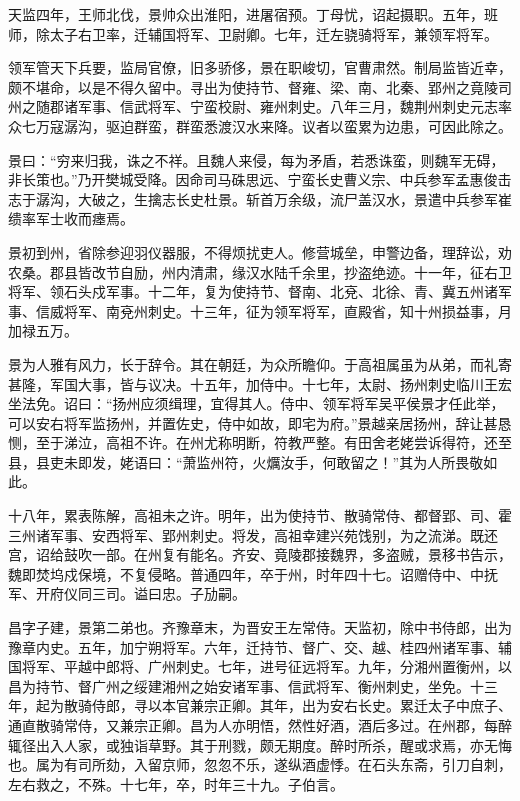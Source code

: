 \documentclass[12pt,UTF8]{ctexbook}
\begin{document}
天监四年，王师北伐，景帅众出淮阳，进屠宿预。丁母忧，诏起摄职。五年，班师，除太子右卫率，迁辅国将军、卫尉卿。七年，迁左骁骑将军，兼领军将军。

领军管天下兵要，监局官僚，旧多骄侈，景在职峻切，官曹肃然。制局监皆近幸，颇不堪命，以是不得久留中。寻出为使持节、督雍、梁、南、北秦、郢州之竟陵司州之随郡诸军事、信武将军、宁蛮校尉、雍州刺史。八年三月，魏荆州刺史元志率众七万寇潺沟，驱迫群蛮，群蛮悉渡汉水来降。议者以蛮累为边患，可因此除之。

景曰：“穷来归我，诛之不祥。且魏人来侵，每为矛盾，若悉诛蛮，则魏军无碍，非长策也。”乃开樊城受降。因命司马硃思远、宁蛮长史曹义宗、中兵参军孟惠俊击志于潺沟，大破之，生擒志长史杜景。斩首万余级，流尸盖汉水，景遣中兵参军崔缋率军士收而瘗焉。

景初到州，省除参迎羽仪器服，不得烦扰吏人。修营城垒，申警边备，理辞讼，劝农桑。郡县皆改节自励，州内清肃，缘汉水陆千余里，抄盗绝迹。十一年，征右卫将军、领石头戍军事。十二年，复为使持节、督南、北兗、北徐、青、冀五州诸军事、信威将军、南兗州刺史。十三年，征为领军将军，直殿省，知十州损益事，月加禄五万。

景为人雅有风力，长于辞令。其在朝廷，为众所瞻仰。于高祖属虽为从弟，而礼寄甚隆，军国大事，皆与议决。十五年，加侍中。十七年，太尉、扬州刺史临川王宏坐法免。诏曰：“扬州应须缉理，宜得其人。侍中、领军将军吴平侯景才任此举，可以安右将军监扬州，并置佐史，侍中如故，即宅为府。”景越亲居扬州，辞让甚恳恻，至于涕泣，高祖不许。在州尤称明断，符教严整。有田舍老姥尝诉得符，还至县，县吏未即发，姥语曰：“萧监州符，火爄汝手，何敢留之！”其为人所畏敬如此。

十八年，累表陈解，高祖未之许。明年，出为使持节、散骑常侍、都督郢、司、霍三州诸军事、安西将军、郢州刺史。将发，高祖幸建兴苑饯别，为之流涕。既还宫，诏给鼓吹一部。在州复有能名。齐安、竟陵郡接魏界，多盗贼，景移书告示，魏即焚坞戍保境，不复侵略。普通四年，卒于州，时年四十七。诏赠侍中、中抚军、开府仪同三司。谥曰忠。子劢嗣。

昌字子建，景第二弟也。齐豫章末，为晋安王左常侍。天监初，除中书侍郎，出为豫章内史。五年，加宁朔将军。六年，迁持节、督广、交、越、桂四州诸军事、辅国将军、平越中郎将、广州刺史。七年，进号征远将军。九年，分湘州置衡州，以昌为持节、督广州之绥建湘州之始安诸军事、信武将军、衡州刺史，坐免。十三年，起为散骑侍郎，寻以本官兼宗正卿。其年，出为安右长史。累迁太子中庶子、通直散骑常侍，又兼宗正卿。昌为人亦明悟，然性好酒，酒后多过。在州郡，每醉辄径出入人家，或独诣草野。其于刑戮，颇无期度。醉时所杀，醒或求焉，亦无悔也。属为有司所劾，入留京师，忽忽不乐，遂纵酒虚悸。在石头东斋，引刀自刺，左右救之，不殊。十七年，卒，时年三十九。子伯言。
\end{document}
